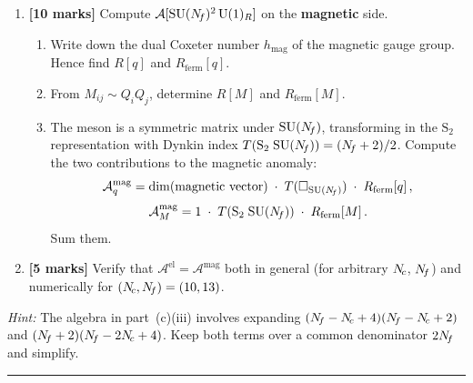 \documentclass[11pt,a4paper]{article}
\begin{document}
\begin{enumerate}[label=(\alph*)]
  \item \textbf{[10 marks]}
    Compute $\mathcal{A}[\mathrm{SU}(N_{\!f})^2\,\mathrm{U}(1)_R]$ on the
    \textbf{magnetic} side.
    \begin{enumerate}[label=(\roman*)]
      \item Write down the dual Coxeter number $h_{\text{mag}}$ of the
        magnetic gauge group.  Hence find $R[q]$ and
        $R_{\text{ferm}}[q]$.
      \item From $M_{ij} \sim Q_i Q_j$, determine $R[M]$ and
        $R_{\text{ferm}}[M]$.
      \item The meson is a symmetric matrix under $\mathrm{SU}(N_{\!f})$,
        transforming in the $\mathrm{S}_2$ representation with Dynkin
        index $T(\mathrm{S}_2\;\mathrm{SU}(N_{\!f})) = (N_{\!f} + 2)/2$.  Compute the
        two contributions to the magnetic anomaly:
        \[
          \mathcal{A}^{\text{mag}}_q
          = \dim(\text{magnetic vector})\;\cdot\;
            T(\square_{\mathrm{SU}(N_{\!f})})\;\cdot\; R_{\text{ferm}}[q]\,,
        \]
        \[
          \mathcal{A}^{\text{mag}}_M
          = 1 \;\cdot\;
            T(\mathrm{S}_2\;\mathrm{SU}(N_{\!f}))\;\cdot\; R_{\text{ferm}}[M]\,.
        \]
        Sum them.
    \end{enumerate}

  \item \textbf{[5 marks]}
    Verify that $\mathcal{A}^{\text{el}} = \mathcal{A}^{\text{mag}}$
    both in general (for arbitrary $N_{\!c}$, $N_{\!f}$) and numerically for
    $(N_{\!c}, N_{\!f}) = (10, 13)$.

\end{enumerate}

\medskip

\noindent\textit{Hint:} The algebra in part~(c)(iii) involves expanding
$(N_{\!f} - N_{\!c} + 4)(N_{\!f} - N_{\!c} + 2)$ and $(N_{\!f} + 2)(N_{\!f} - 2N_{\!c} + 4)$.
Keep both terms over a common denominator $2N_{\!f}$ and simplify.


\bigskip
\hrule
\bigskip
\end{document}
